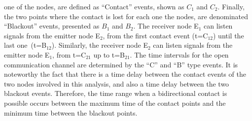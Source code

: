 \documentclass[crop]{CSLB}
\newcommand{\cetis}{nodes}
\begin{document}
one of the \cetis{}, are defined as ``Contact'' events, shown as $C_1$
and $C_2$.
%
Finally, the two points where the contact is lost for each one the
\cetis{}, are denominated ``Blackout'' events, presented as $B_1$ and
$B_2$.
%
The receiver node E$_1$ can listen signals from the emitter node
E$_2$, from the first contact event (t=C$_{12}$) until the last
one (t=B$_{12}$).
%
Similarly, the receiver node E$_2$ can listen signals from the emitter
node E$_1$, from t=C$_{21}$ up to t=B$_{21}$.
%
The time intervals for the open communication channel are determined
by the ``C'' and ``B'' type events.
%
It is noteworthy the fact that there is a time delay between the
contact events of the two \cetis{} involved in this analysis, and also
a time delay between the two blackout events.
%
Therefore, the time range when a bidirectional contact is possible
occurs between the maximum time of the contact points and the minimum
time between the blackout points.
\end{document}
